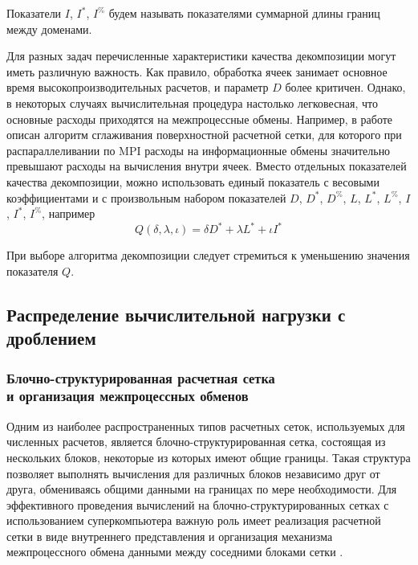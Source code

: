 \begin{definition}
Показатели $I$, $I^{*}$, $I^{\%}$ будем называть показателями суммарной длины границ между доменами\label{term:decomp_sumbord}.
\end{definition}

Для разных задач перечисленные характеристики качества декомпозиции могут иметь различную важность.
Как правило, обработка ячеек занимает основное время высокопроизводительных расчетов, и параметр $D$ более критичен.
Однако, в некоторых случаях вычислительная процедура настолько легковесная, что основные расходы приходятся на межпроцессные обмены.
Например, в работе \cite{Tong2017Remesh} описан алгоритм сглаживания поверхностной расчетной сетки, для которого при распараллеливании по MPI расходы на информационные обмены значительно превышают расходы на вычисления внутри ячеек.
Вместо отдельных показателей качества декомпозиции, можно использовать единый показатель с весовыми коэффициентами и с произвольным набором показателей $D$, $D^{*}$, $D^{\%}$, $L$, $L^{*}$, $L^{\%}$, $I$, $I^{*}$, $I^{\%}$, например
\begin{equation}
	Q(\delta, \lambda, \iota) = \delta D^{*} + \lambda L^{*} + \iota I^{*}
\end{equation}

При выборе алгоритма декомпозиции следует стремиться к уменьшению значения показателя $Q$.


\subsection{Распределение вычислительной нагрузки с дроблением}

\subsubsection{Блочно-структурированная расчетная сетка \\ и организация межпроцессных обменов}

Одним из наиболее распространенных типов расчетных сеток, используемых для численных расчетов, является блочно-структурированная сетка\label{term:mesh_block_struct2}, состоящая из нескольких блоков, некоторые из которых имеют общие границы.
Такая структура позволяет выполнять вычисления для различных блоков независимо друг от друга, обмениваясь общими данными на границах по мере необходимости.
Для эффективного проведения вычислений на блочно-структурированных сетках с использованием суперкомпьютера важную роль имеет реализация расчетной сетки в виде внутреннего представления и организация механизма межпроцессного обмена данными между соседними блоками сетки \cite{Rybakov2017Mesh}.

